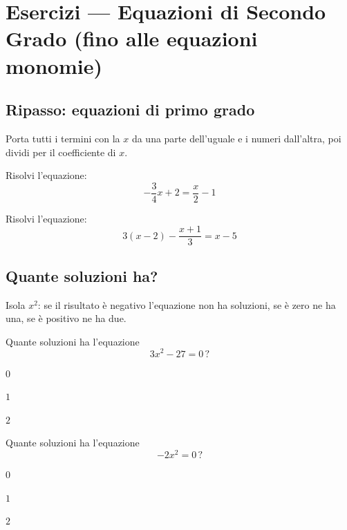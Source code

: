 \documentclass[11pt]{report}
\begin{document}
\chapter{Esercizi — Equazioni di Secondo Grado (fino alle equazioni monomie)}

\section{Ripasso: equazioni di primo grado}

\begin{mdframed}
Porta tutti i termini con la $x$ da una parte dell'uguale e i numeri dall'altra, poi dividi per il coefficiente di $x$.
\end{mdframed}

\begin{exercise}[\onestar]
Risolvi l'equazione:
$$
-\frac34 x + 2 = \frac{x}{2} - 1
$$
\end{exercise}

\begin{exercise}[\onestar]
Risolvi l'equazione:
$$
3(x-2) - \frac{x+1}{3} = x-5
$$
\end{exercise}

\section{Quante soluzioni ha?}

\begin{mdframed}
Isola $x^2$: se il risultato è negativo l'equazione non ha soluzioni, se è zero ne ha una, se è positivo ne ha due.
\end{mdframed}

\begin{exercise}[\onestar]
Quante soluzioni ha l'equazione
$$
3x^2-27=0 \, ?
$$
\begin{sceltamultipla}
\item $0$
\item $1$
\item $2$
\end{sceltamultipla}
\end{exercise}

\begin{exercise}[\onestar]
Quante soluzioni ha l'equazione
$$
-2x^2=0 \, ?
$$
\begin{sceltamultipla}
\item $0$
\item $1$
\item $2$
\end{sceltamultipla}
\end{exercise}
\end{document}
